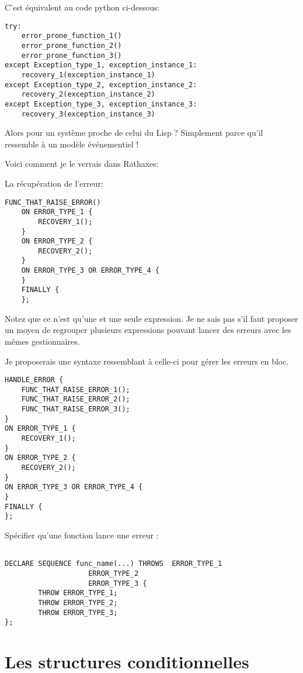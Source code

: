 \documentclass[french]{rtxreport}
\begin{document}
C'est équivalent au code python ci-dessous:
\lstset{language=Python}
\begin{lstlisting}
try:
	error_prone_function_1()
	error_prone_function_2()
	error_prone_function_3()
except Exception_type_1, exception_instance_1:
	recovery_1(exception_instance_1)
except Exception_type_2, exception_instance_2:
	recovery_2(exception_instance_2)
except Exception_type_3, exception_instance_3:
	recovery_3(exception_instance_3)
\end{lstlisting}

\lstset{language=rathaxes}

Alors pour un système proche de celui du Lisp ?
Simplement parce qu'il ressemble à un modèle événementiel !

Voici comment je le verrais dans Rathaxes:

La récupération de l'erreur:
\begin{lstlisting}
FUNC_THAT_RAISE_ERROR()
	ON ERROR_TYPE_1 {
		RECOVERY_1();
	}
	ON ERROR_TYPE_2 {
		RECOVERY_2();
	}
	ON ERROR_TYPE_3 OR ERROR_TYPE_4 {
	}
	FINALLY {
	};
\end{lstlisting}

Notez que ce n’est qu’une et une seule expression. Je ne sais pas s’il faut proposer un moyen de regrouper plusieurs expressions pouvant lancer des erreurs avec les mêmes gestionnaires.

Je proposerais une syntaxe ressemblant à celle-ci pour gérer les erreurs en bloc.

\begin{lstlisting}
HANDLE_ERROR {
	FUNC_THAT_RAISE_ERROR_1();
	FUNC_THAT_RAISE_ERROR_2();
	FUNC_THAT_RAISE_ERROR_3();
}
ON ERROR_TYPE_1 {
	RECOVERY_1();
}
ON ERROR_TYPE_2 {
	RECOVERY_2();
}
ON ERROR_TYPE_3 OR ERROR_TYPE_4 {
}
FINALLY {
};
\end{lstlisting}

Spécifier qu’une fonction lance une erreur :

\begin{lstlisting}

DECLARE SEQUENCE func_name(...) THROWS	ERROR_TYPE_1
					ERROR_TYPE_2
					ERROR_TYPE_3 {
		THROW ERROR_TYPE_1;
		THROW ERROR_TYPE_2;
		THROW ERROR_TYPE_3;
};

\end{lstlisting}


\chapter{Les structures conditionnelles}
\end{document}
